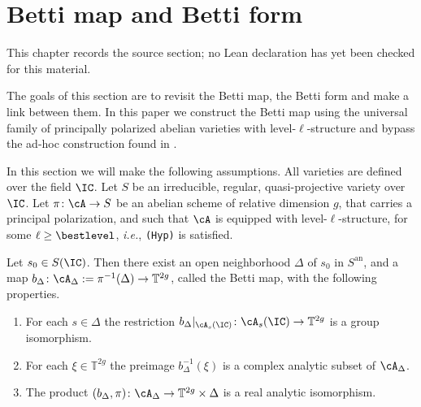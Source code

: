 \chapter{Betti map and Betti form}
\label{uniformity-mordell-lang-curves-chapter-02}

\begin{remark}
\label{uniformity-mordell-lang-curves-chapter-02-source}
This chapter records the source section; no Lean declaration has yet been checked for this material.
\notready
\end{remark}

\label{SectionBettiRevisited}
The goals of this section are to revisit the Betti map, the Betti form and make a link between them.
In this paper we construct the Betti map using the universal family of
principally polarized abelian varieties with level-$\ell$-structure and
bypass the ad-hoc construction found in \cite{GaoHab}.

 In this section we will make
the following assumptions.
All varieties  are defined over the field $\IC$.
Let $S$ be an  irreducible, regular, quasi-projective variety over $\IC$.
Let $\pi\colon \cA\rightarrow S$ be an abelian scheme of  relative
dimension $g$, that carries a principal polarization, and such that
 $\cA$ is equipped with level-$\ell$-structure, for some
 $\ell\ge\bestlevel$, \textit{i.e.}, {\tt (Hyp)} is satisfied.

\begin{proposition}
\notready\label{PropBettiMap}
Let $s_0 \in S(\IC)$. Then there exist an open neighborhood $\Delta$ of $s_0$ in $S^{\mathrm{an}}$, and a map $b_{\Delta} \colon \cA_{\Delta} := \pi^{-1}(\Delta) \rightarrow \mathbb T^{2g}$, called the Betti map, with the following properties.
\begin{enumerate}
\item[(i)] For each $s \in \Delta$ the restriction $b_{\Delta}|_{\cA_s(\IC)} \colon \cA_s(\IC) \rightarrow \mathbb T^{2g}$ is a group isomorphism.
\item[(ii)] For each $\xi \in \mathbb T^{2g}$ the preimage $b_{\Delta}^{-1}(\xi)$ is a complex analytic subset of $\cA_{\Delta}$.
\item[(iii)] The product
$(b_{\Delta},\pi) \colon \cA_{\Delta} \rightarrow \mathbb
T^{2g} \times \Delta$ is a real analytic isomorphism.%
\end{enumerate}
\end{proposition}

